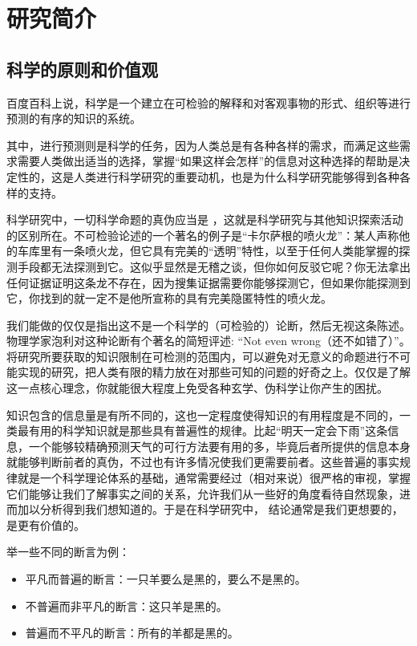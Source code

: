 \documentclass[a4paper,10pt,english]{sphinxmanual}
\begin{document}
\chapter{研究简介}
\label{\detokenize{3. Intro_Research:id1}}\label{\detokenize{3. Intro_Research::doc}}

\section{科学的原则和价值观}
\label{\detokenize{3. Intro_Research:id2}}
百度百科上说，科学是一个建立在可检验的解释和对客观事物的形式、组织等进行预测的有序的知识的系统。

其中，进行预测则是科学的任务，因为人类总是有各种各样的需求，而满足这些需求需要人类做出适当的选择，掌握“如果这样会怎样”的信息对这种选择的帮助是决定性的，这是人类进行科学研究的重要动机，也是为什么科学研究能够得到各种各样的支持。

科学研究中，一切科学命题的真伪应当是  ，这就是科学研究与其他知识探索活动的区别所在。不可检验论述的一个著名的例子是“卡尔萨根的喷火龙”：某人声称他的车库里有一条喷火龙，但它具有完美的“透明”特性，以至于任何人类能掌握的探测手段都无法探测到它。这似乎显然是无稽之谈，但你如何反驳它呢？你无法拿出任何证据证明这条龙不存在，因为搜集证据需要你能够探测它，但如果你能探测到它，你找到的就一定不是他所宣称的具有完美隐匿特性的喷火龙。

我们能做的仅仅是指出这不是一个科学的（可检验的）论断，然后无视这条陈述。物理学家泡利对这种论断有个著名的简短评述: “Not even wrong（还不如错了）”。 将研究所要获取的知识限制在可检测的范围内，可以避免对无意义的命题进行不可能实现的研究，把人类有限的精力放在对那些可知的问题的好奇之上。仅仅是了解这一点核心理念，你就能很大程度上免受各种玄学、伪科学让你产生的困扰。

知识包含的信息量是有所不同的，这也一定程度使得知识的有用程度是不同的，一类最有用的科学知识就是那些具有普遍性的规律。比起“明天一定会下雨”这条信息，一个能够较精确预测天气的可行方法要有用的多，毕竟后者所提供的信息本身就能够判断前者的真伪，不过也有许多情况使我们更需要前者。这些普遍的事实规律就是一个科学理论体系的基础，通常需要经过（相对来说）很严格的审视，掌握它们能够让我们了解事实之间的关系，允许我们从一些好的角度看待自然现象，进而加以分析得到我们想知道的。于是在科学研究中，  结论通常是我们更想要的，是更有价值的。

举一些不同的断言为例：
\begin{itemize}
\item {} 
平凡而普遍的断言：一只羊要么是黑的，要么不是黑的。

\item {} 
不普遍而非平凡的断言：这只羊是黑的。

\item {} 
普遍而不平凡的断言：所有的羊都是黑的。

\end{itemize}
\end{document}
